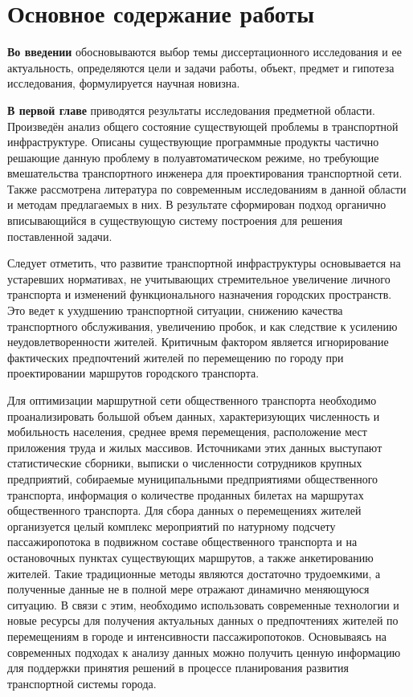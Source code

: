 
\section{Основное содержание работы}
\textbf{Во введении} обосновываются выбор темы диссертационного исследования и ее актуальность, определяются 
цели и задачи работы, объект, предмет и гипотеза исследования, формулируется научная новизна.

\textbf{В первой главе} приводятся результаты исследования предметной области. Произведён анализ общего 
состояние существующей проблемы в транспортной инфраструктуре. Описаны существующие программные продукты 
частично решающие данную проблему в полуавтоматическом режиме, но требующие вмешательства транспортного 
инженера для проектирования транспортной сети. Также рассмотрена литература по современным исследованиям в 
данной области и методам предлагаемых в них. В результате сформирован подход органично вписывающийся в 
существующую систему построения для решения поставленной задачи.

Следует отметить, что развитие транспортной инфраструктуры основывается на устаревших нормативах, не 
учитывающих стремительное увеличение личного транспорта и изменений функционального назначения городских 
пространств. Это ведет к ухудшению транспортной ситуации, снижению качества транспортного обслуживания, 
увеличению пробок, и как следствие к усилению неудовлетворенности жителей. Критичным фактором является 
игнорирование фактических предпочтений жителей по перемещению по городу при проектировании маршрутов 
городского транспорта.

Для оптимизации маршрутной сети общественного транспорта необходимо проанализировать большой объем данных, 
характеризующих численность и мобильность населения, среднее время перемещения, расположение мест приложения 
труда и жилых массивов. Источниками этих данных выступают статистические сборники, выписки о численности 
сотрудников крупных предприятий, собираемые муниципальными предприятиями общественного транспорта, 
информация о количестве проданных билетах на маршрутах общественного транспорта. Для сбора данных о 
перемещениях жителей организуется целый комплекс мероприятий по натурному подсчету пассажиропотока в 
подвижном составе общественного транспорта и на остановочных пунктах существующих маршрутов, а также 
анкетированию жителей. Такие традиционные методы являются достаточно трудоемкими, а полученные данные не в 
полной мере отражают динамично меняющуюся ситуацию. В связи с этим, необходимо использовать современные 
технологии и новые ресурсы для получения актуальных данных о предпочтениях жителей по перемещениям в городе 
и интенсивности пассажиропотоков. Основываясь на современных подходах к анализу данных можно получить 
ценную информацию для поддержки принятия решений в процессе планирования развития транспортной системы 
города.

